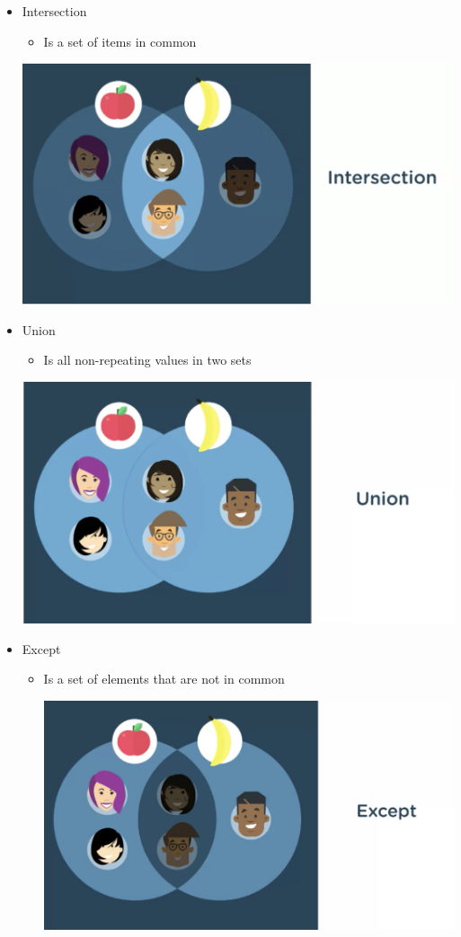 \documentclass[12pt]{article}
\begin{document}
\begin{itemize}
    \item Intersection
    \begin{itemize}
        \item Is a set of items in common
    \end{itemize}

    \begin{center}
    \includegraphics[width=0.8\linewidth]{images/part_1_notes_2.png}
    \end{center}

    \item Union
    \begin{itemize}
        \item Is all non-repeating values in two sets
    \end{itemize}

    \begin{center}
    \includegraphics[width=0.8\linewidth]{images/part_1_notes_3.png}
    \end{center}

    \item Except
    \begin{itemize}
        \item Is a set of elements that are not in common

    \begin{center}
    \includegraphics[width=0.8\linewidth]{images/part_1_notes_4.png}
    \end{center}


\end{itemize}
\end{itemize}
\end{document}

